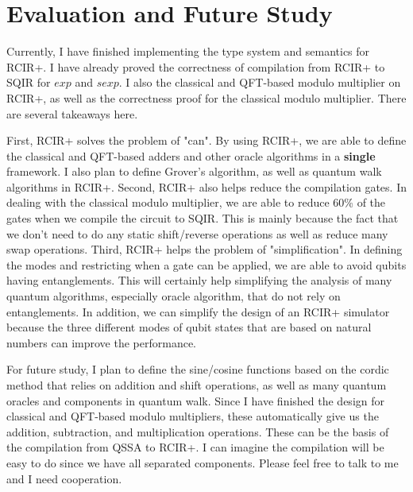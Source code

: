\section{Evaluation and Future Study}
\label{sec:eval}
 
Currently, I have finished implementing the type system and semantics for RCIR+. I have already proved the correctness of compilation from RCIR+ to SQIR for $exp$ and $sexp$. I also the classical and QFT-based modulo multiplier on RCIR+, as well as the correctness proof for the classical modulo multiplier. There are several takeaways here. 

First, RCIR+ solves the problem of "can". By using RCIR+, we are able to define the classical and QFT-based adders and other oracle algorithms in a \textbf{single} framework. I also plan to define Grover's algorithm, as well as quantum walk algorithms in RCIR+. 
Second, RCIR+ also helps reduce the compilation gates. In dealing with the classical modulo multiplier, we are able to reduce 60\% of the
gates when we compile the circuit to SQIR. This is mainly because the fact that we don't need to do any static shift/reverse operations as well as reduce many swap operations. 
Third, RCIR+ helps the problem of "simplification". In defining the modes and restricting when a gate can be applied, we are able to avoid qubits having entanglements. This will certainly help simplifying the analysis of many quantum algorithms, especially oracle algorithm, that do not rely on entanglements. 
In addition, we can simplify the design of an RCIR+ simulator because the three different modes of qubit states that are based on natural numbers can improve the performance. 

For future study, I plan to define the sine/cosine functions based on the cordic method that relies on addition and shift operations, as well as many quantum oracles and components in quantum walk. Since I have finished the design for classical and QFT-based modulo multipliers, these automatically give us the addition, subtraction, and multiplication operations. These can be the basis of the compilation from QSSA to RCIR+. I can imagine the compilation will be easy to do since we have all separated components. Please feel free to talk to me and I need cooperation. 



